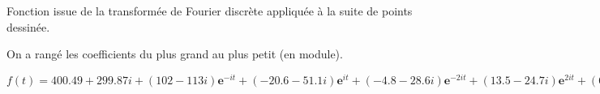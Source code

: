 \documentclass[10pt,a4paper]{article}
\begin{document}
\begin{center}
\begin{LARGE}Fonction issue de la transformée de Fourier discrète appliquée à la suite de points dessinée.
\end{LARGE}
\end{center}

On a rangé les coefficients du plus grand au plus petit (en module).
\vspace{2em}

$f(t)=400.49+299.87i+(102-113i)\textbf{e}^{-it}+(-20.6-51.1i)\textbf{e}^{it}+(-4.8-28.6i)\textbf{e}^{-2it}+(13.5-24.7i)\textbf{e}^{2it}+(6.3-7.7i)\textbf{e}^{3it}+(-9.21+3.63i)\textbf{e}^{-3it}+(-2.52-6.03i)\textbf{e}^{-5it}+(-1.17-4.45i)\textbf{e}^{5it}+(-0.69-3.64i)\textbf{e}^{-12it}+(-2.49-2.53i)\textbf{e}^{4it}+(2.16+2.22i)\textbf{e}^{12it}+(1.56-2.67i)\textbf{e}^{-9it}+(-1.79-2.28i)\textbf{e}^{11it}+(-0.412-2.85i)\textbf{e}^{-4it}+(2.3-1.72i)\textbf{e}^{-7it}+(-0.725-2.72i)\textbf{e}^{6it}+(2.13-1.77i)\textbf{e}^{-10it}+(0.313+2.6i)\textbf{e}^{-13it}+(0.397+2.3i)\textbf{e}^{10it}+(0.504-1.85i)\textbf{e}^{-8it}+(-0.362-1.4i)\textbf{e}^{-15it}+(0.811-1.05i)\textbf{e}^{13it}+(0.435+1.21i)\textbf{e}^{-11it}+(-0.699-0.931i)\textbf{e}^{17it}+(-0.562-0.961i)\textbf{e}^{8it}+(0.445-0.885i)\textbf{e}^{-6it}+(-0.0273+0.962i)\textbf{e}^{-20it}+(-0.564-0.742i)\textbf{e}^{15it}+(0.529-0.679i)\textbf{e}^{-24it}+(-0.827-0.235i)\textbf{e}^{18it}+(0.034+0.83i)\textbf{e}^{19it}+(-0.311-0.671i)\textbf{e}^{-14it}+(-0.714+0.188i)\textbf{e}^{-25it}+(-0.308-0.668i)\textbf{e}^{-16it}+(0.706-0.18i)\textbf{e}^{-19it}+(-0.557-0.412i)\textbf{e}^{7it}+(0.633-0.2i)\textbf{e}^{23it}+(0.307-0.569i)\textbf{e}^{26it}+(0.613+0.173i)\textbf{e}^{-26it}+(-0.049+0.619i)\textbf{e}^{14it}+(0.34-0.514i)\textbf{e}^{-27it}+(-0.367+0.445i)\textbf{e}^{-29it}+(0.506-0.215i)\textbf{e}^{35it}+(0.529+0.0845i)\textbf{e}^{-21it}+(0.0978+0.502i)\textbf{e}^{31it}+(0.493+0.0717i)\textbf{e}^{-23it}+(0.365-0.331i)\textbf{e}^{49it}+(0.314+0.38i)\textbf{e}^{-30it}+(-0.00976-0.492i)\textbf{e}^{9it}$
\end{document}

